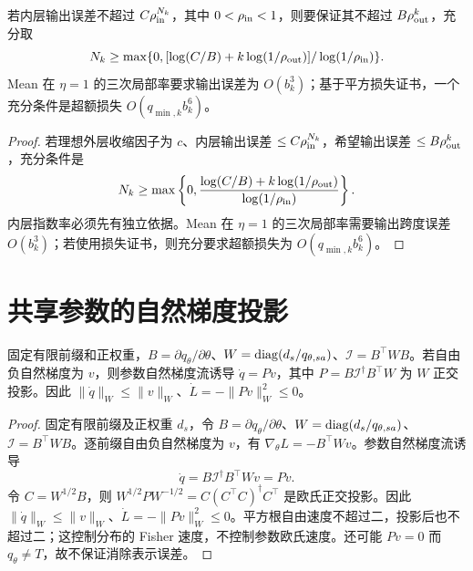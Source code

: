 \begin{proposition}[保持外层速率所需的内层精度]
若内层输出误差不超过 $C\rho_{\rm in}^{N_k}$，其中 $0<\rho_{\rm in}<1$，则要保证其不超过 $B\rho_{\rm out}^k$，充分取
\begin{equation}
N_k\ge\max\{0,[\log(C/B)+k\log(1/\rho_{\rm out})]/\log(1/\rho_{\rm in})\}.
\end{equation}
Mean 在 $\eta=1$ 的三次局部率要求输出误差为 $O(b_k^3)$；基于平方损失证书，一个充分条件是超额损失 $O(q_{\min,k}b_k^6)$。
\end{proposition}
\begin{proof}
若理想外层收缩因子为 $c$、内层输出误差 $\le C\rho_{\rm in}^{N_k}$，希望输出误差 $\le B\rho_{\rm out}^k$，充分条件是
\begin{equation}
N_k\ge\max\left\{0,\frac{\log(C/B)+k\log(1/\rho_{\rm out})}{\log(1/\rho_{\rm in})}\right\}.
\end{equation}
内层指数率必须先有独立依据。Mean 在 $\eta=1$ 的三次局部率需要输出跨度误差 $O(b_k^3)$；若使用损失证书，则充分要求超额损失为 $O(q_{\min,k}b_k^6)$。
\end{proof}

\section{共享参数的自然梯度投影}
\begin{proposition}[共享参数自然梯度的正交投影]
固定有限前缀和正权重，$B=\partial q_\theta/\partial\theta$、$W=\operatorname{diag}(d_s/q_{\theta,sa})$、$\mathcal I=B^\top WB$。若自由负自然梯度为 $v$，则参数自然梯度流诱导 $\dot q=Pv$，其中 $P=B\mathcal I^\dagger B^\top W$ 为 $W$ 正交投影。因此 $\|\dot q\|_W\le\|v\|_W$、$\dot L=-\|Pv\|_W^2\le0$。
\end{proposition}
\begin{proof}
固定有限前缀及正权重 $d_s$，令 $B=\partial q_\theta/\partial\theta$、$W=\operatorname{diag}(d_s/q_{\theta,sa})$、$\mathcal I=B^\top WB$。逐前缀自由负自然梯度为 $v$，有 $\nabla_\theta L=-B^\top Wv$。参数自然梯度流诱导
\begin{equation}
\dot q=B\mathcal I^\dagger B^\top Wv=Pv.
\end{equation}
令 $C=W^{1/2}B$，则 $W^{1/2}PW^{-1/2}=C(C^\top C)^\dagger C^\top$ 是欧氏正交投影。因此 $\|\dot q\|_W\le\|v\|_W$、$\dot L=-\|Pv\|_W^2\le0$。平方根自由速度不超过二，投影后也不超过二；这控制分布的 Fisher 速度，不控制参数欧氏速度。还可能 $Pv=0$ 而 $q_\theta\ne T$，故不保证消除表示误差。
\end{proof}

